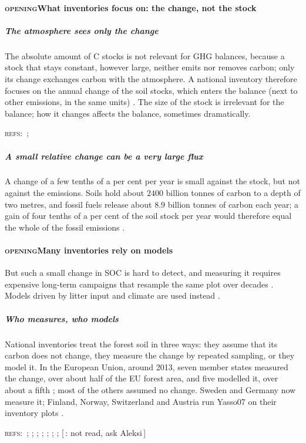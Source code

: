 \documentclass[11pt]{article}
\newcommand{\beat}[1]{\textcolor{black!45}{\textsc{\small #1}}\enspace}
\newcommand{\gap}[1]{\textcolor{red!70!black}{\small[\,#1\,]}}
\newcommand{\refs}[1]{\par\textcolor{red!70!black}{\footnotesize\textsc{refs:}\ #1}\par}
\begin{document}
\paragraph{\beat{opening}What inventories focus on: the change, not the stock}
\subparagraph{The atmosphere sees only the change}
The absolute amount of C stocks is not relevant for GHG balances, because a stock that stays constant, however large, neither emits nor removes carbon; only its change
exchanges carbon with the atmosphere. A national inventory therefore focuses on the annual change of the soil stocks, which enters the balance (next to other emissions,
in the same units) \citep{IPCC2006V4, Blujdea2015}. The size of the stock is irrelevant for the balance; how it changes affects the balance, sometimes dramatically.
\refs{\citet{IPCC2006V4}; \citet{Blujdea2015}}
\subparagraph{A small relative change can be a very large flux}
A change of a few tenths of a per cent per year is small against the stock, but not against the emissions. Soils hold about $2400$ billion tonnes of carbon to a depth of two metres, and fossil fuels release about $8.9$ billion tonnes of carbon each year; a gain of four tenths of a per cent of the soil stock per year would therefore equal the whole of the fossil emissions
\citep{Minasny2017}. 

\paragraph{\beat{opening}Many inventories rely on models}
But such a small change in SOC is hard to detect, and measuring it requires expensive long-term
campaigns that resample the same plot over decades \citep{Jandl2014}. Models driven by litter input and
climate are used instead \citep{Hernandez2017}.
\subparagraph{Who measures, who models}
National inventories treat the forest soil in three ways: they assume that its carbon does not
change, they measure the change by repeated sampling, or they model it. In the European Union,
around 2013, seven member states measured the change, over about half of the EU forest area, and
five modelled it, over about a fifth \citep{Blujdea2015}; most of the others assumed no change.
Sweden \citep{SwedenNID2026} and Germany \citep{Gruneberg2014} now measure it; Finland, Norway,
Switzerland and Austria run Yasso07 on their inventory plots \citep{StatFin2025NID,NorwayNID2025}.
\refs{\citet{Jandl2014}; \citet{Hernandez2017}; \citet{SwedenNID2026}; \citet{Gruneberg2014};
\citet{StatFin2025NID}; \citet{NorwayNID2025}; \citet{Blujdea2015}; \gap{\citet{Didion2016}: not read, ask Aleksi}}
\end{document}
